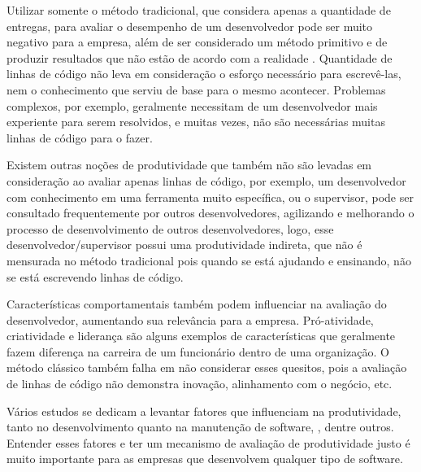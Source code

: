 Utilizar somente o método tradicional, que considera apenas a quantidade de entregas, para avaliar o desempenho de um desenvolvedor pode ser muito negativo para a empresa, além de ser considerado um método primitivo e de produzir resultados que não estão de acordo com a realidade \cite{Symons2010}. Quantidade de linhas de código não leva em consideração o esforço necessário para escrevê-las, nem o conhecimento que serviu de base para o mesmo acontecer. Problemas complexos, por exemplo, geralmente necessitam de um desenvolvedor mais experiente para serem resolvidos, e muitas vezes, não são necessárias muitas linhas de código para o fazer.

Existem outras noções de produtividade que também não são levadas em consideração ao avaliar apenas linhas de código, por exemplo, um desenvolvedor com conhecimento em uma ferramenta muito específica, ou o supervisor, pode ser consultado frequentemente por outros desenvolvedores, agilizando e melhorando o processo de desenvolvimento de outros desenvolvedores, logo, esse desenvolvedor/supervisor possui uma produtividade indireta, que não é mensurada no método tradicional pois quando se está ajudando e ensinando, não se está escrevendo linhas de código.

Características comportamentais também podem influenciar na avaliação do desenvolvedor, aumentando sua relevância para a empresa. Pró-atividade, criatividade e liderança são alguns exemplos de características que geralmente fazem diferença na carreira de um funcionário dentro de uma organização. O método clássico também falha em não considerar esses quesitos, pois a avaliação de linhas de código não demonstra inovação, alinhamento com o negócio, etc.

Vários estudos se dedicam a levantar fatores que influenciam na produtividade, tanto no desenvolvimento quanto na manutenção de software, \cite{deBarrosSampaio2010, Wagner2008, Calow1991, Vosburgh1984}, dentre outros. Entender esses fatores e ter um mecanismo de avaliação de produtividade justo é muito importante para as empresas que desenvolvem qualquer tipo de software.

